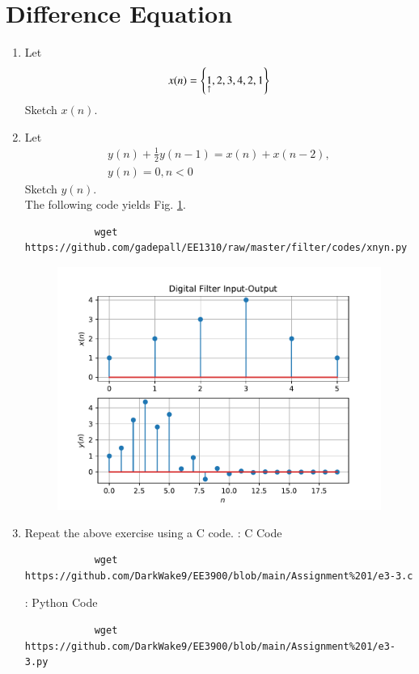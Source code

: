 \documentclass[journal,12pt,twocolumn]{IEEEtran}
\renewcommand\thesection{\arabic{section}}
\begin{document}
	\section{Difference Equation}
	\begin{enumerate}[label=\thesection.\arabic*,ref=\thesection.\theenumi]
		\item Let
		\begin{equation}
			\label{def:xn}
			x(n) = \left\{\underset{\uparrow}{1},2,3,4,2,1\right\}
		\end{equation}
		Sketch $x(n)$.
		\item Let
		\begin{multline}
			\label{eq:iir_filter}
			y(n) + \frac{1}{2}y(n-1) = x(n) + x(n-2), 
			\\
			y(n) = 0, n < 0
		\end{multline}
		Sketch $y(n)$.
		\\
		\solution The following code yields Fig. \ref{fig:xnyn}.
		\begin{lstlisting}
			wget https://github.com/gadepall/EE1310/raw/master/filter/codes/xnyn.py
		\end{lstlisting}
		\begin{figure}[!ht]
			\begin{center}
				\includegraphics[width=\columnwidth]{./figs/xnyn}
			\end{center}
			\label{fig:xnyn}	
		\end{figure}
		
		\item Repeat the above exercise using a C code.
		\solution: C Code
		\begin{lstlisting}
			wget https://github.com/DarkWake9/EE3900/blob/main/Assignment%201/e3-3.c
		\end{lstlisting}
		\solution: Python Code
		\begin{lstlisting}
			wget https://github.com/DarkWake9/EE3900/blob/main/Assignment%201/e3-3.py
		\end{lstlisting}		
	\end{enumerate}
\end{document}
